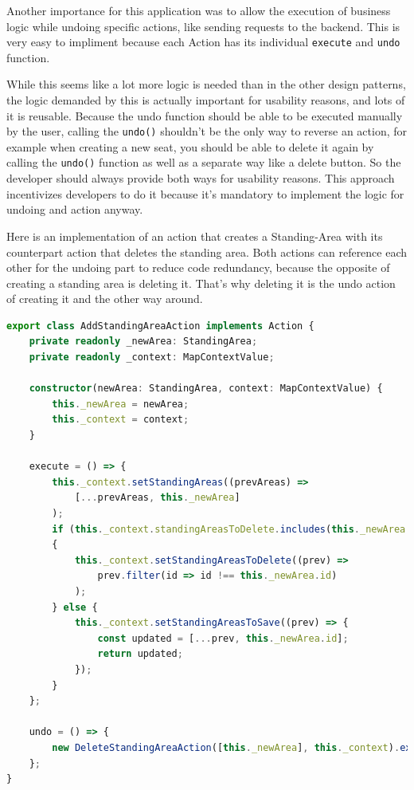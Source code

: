 Another importance for this application was to allow the execution of business logic while undoing specific actions, like sending requests to the backend. This is very easy to impliment because each Action has its individual \texttt{execute} and \texttt{undo} function.

While this seems like a lot more logic is needed than in the other design patterns, the logic demanded by this is actually important for usability reasons, and lots of it is reusable. Because the undo function should be able to be executed manually by the user, calling the \texttt{undo()} shouldn't be the only way to reverse an action, for example when creating a new seat, you should be able to delete it again by calling the \texttt{undo()} function as well as a separate way like a delete button. So the developer should always provide both ways for usability reasons. This approach incentivizes developers to do it because it's mandatory to implement the logic for undoing and action anyway.

Here is an implementation of an action that creates a Standing-Area with its counterpart action that deletes the standing area. Both actions can reference each other for the undoing part to reduce code redundancy, because the opposite of creating a standing area is deleting it. That's why deleting it is the undo action of creating it and the other way around.

\begin{lstlisting}[language=TypeScript,caption={Add standing-area action implementation},label={lst:add-standing-area-action-implementation}]
export class AddStandingAreaAction implements Action {
    private readonly _newArea: StandingArea;
    private readonly _context: MapContextValue;

    constructor(newArea: StandingArea, context: MapContextValue) {
        this._newArea = newArea;
        this._context = context;
    }

    execute = () => {
        this._context.setStandingAreas((prevAreas) => 
            [...prevAreas, this._newArea]
        );
        if (this._context.standingAreasToDelete.includes(this._newArea.id))
        {
            this._context.setStandingAreasToDelete((prev) =>
                prev.filter(id => id !== this._newArea.id)
            );
        } else {
            this._context.setStandingAreasToSave((prev) => {
                const updated = [...prev, this._newArea.id];
                return updated;
            });
        }
    };

    undo = () => {
        new DeleteStandingAreaAction([this._newArea], this._context).execute()
    };
}
\end{lstlisting}

